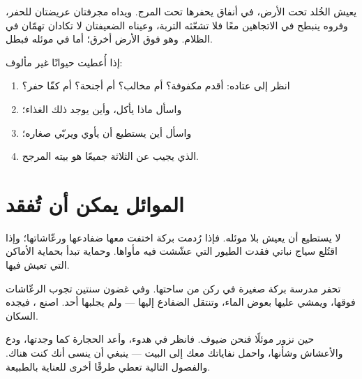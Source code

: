 \begin{example}\label{ex:g2:where-animals-live:mole}
يعيش الخُلد تحت الأرض، في أنفاق يحفرها تحت المرج. ويداه مجرفتان
عريضتان للحفر، وفروه ينبطح في الاتجاهين معًا فلا تشعّثه التربة،
وعيناه الضعيفتان لا تكادان تهمّان في الظلام. وهو فوق الأرض أخرق؛
أما في موئله فبطل.
\end{example}

\begin{method}\label{met:g2:where-animals-live:matching}
إذا أُعطيت حيوانًا غير مألوف:
\begin{enumerate}
  \item انظر إلى عتاده: أقدم مكفوفة؟ أم مخالب؟ أم أجنحة؟ أم كفّا
        حفر؟
  \item واسأل ماذا يأكل، وأين يوجد ذلك الغذاء؛
  \item واسأل أين يستطيع أن يأوي ويربّي صغاره؛
  \item {} الذي يجيب عن الثلاثة جميعًا هو بيته المرجح.
\end{enumerate}
\end{method}

\section{الموائل يمكن أن تُفقد}

\begin{proposition}\label{prop:g2:where-animals-live:loss}
لا يستطيع  أن يعيش بلا موئله. فإذا رُدمت بركة اختفت معها
ضفادعها ورعّاشاتها؛ وإذا اقتُلع سياج نباتي فقدت الطيور التي عشّشت
فيه مأواها. وحماية  تبدأ بحماية الأماكن التي تعيش فيها.
\end{proposition}
\admitted

\begin{example}\label{ex:g2:where-animals-live:schoolpond}
تحفر مدرسة بركة صغيرة في ركن من ساحتها. وفي غضون سنتين تجوب
الرعّاشات فوقها، ويمشي عليها بعوض الماء، وتنتقل الضفادع إليها ---
ولم يجلبها أحد. اصنع ، فيجده السكان.
\end{example}

\begin{remark}\label{rem:g2:where-animals-live:respect}
حين نزور موئلًا فنحن ضيوف. فانظر في هدوء، وأعد الحجارة كما وجدتها،
ودع  والأعشاش وشأنها، واحمل نفاياتك معك إلى البيت --- ينبغي
أن ينسى  أنك كنت هناك. والفصول التالية تعطي طرقًا أخرى
للعناية بالطبيعة.
\end{remark}

